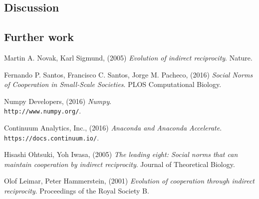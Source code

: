 \documentclass[10pt,a4paper]{article}
\begin{document}
\subsection{Discussion}

\subsection{Further work}


\pagebreak
\begin{thebibliography}{9}

Martin A. Novak, Karl Sigmund, (2005) 
\textit{Evolution of indirect reciprocity}. 
Nature.

Fernando P. Santos, Francisco C. Santos, Jorge M. Pacheco, (2016) 
\textit{Social Norms of Cooperation in Small-Scale Societies}. 
PLOS Computational Biology.

Numpy Developers, (2016) 
\textit{Numpy}. 
\\\texttt{http://www.numpy.org/}.

Continuum Analytics, Inc., (2016) 
\textit{Anaconda and Anaconda Accelerate}. 
\\\texttt{https://docs.continuum.io/}.

Hisashi Ohtsuki, Yoh Iwasa, (2005) 
\textit{The leading eight: Social norms that can maintain cooperation by indirect reciprocity}. 
Journal of Theoretical Biology.

Olof Leimar, Peter Hammerstein, (2001) 
\textit{Evolution of cooperation through indirect reciprocity}. 
Proceedings of the Royal Society B.

\end{thebibliography}
\end{document}
